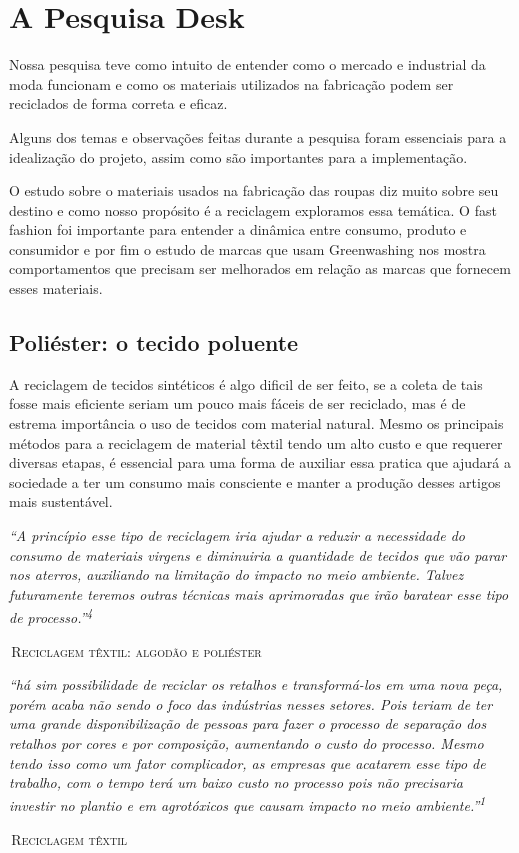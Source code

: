 \documentclass[12pt, a4paper]{article}
\newcommand{\novaSecao}[1]{\clearpage\vspace*{2.2cm}\section{#1}}
\newenvironment{citacaoBox}{%
  \par\vspace{6pt}%
  \def\FrameCommand{{\color{oliveSoft}\vrule width 2pt}\hspace{12pt}}%
  \MakeFramed{\advance\hsize-\width\FrameRestore}%
  \small\itshape\color{ink}%
}{%
  \par\endMakeFramed\vspace{6pt}%
}
\newcommand{\citacaoDestaque}[2]{%
  \begin{citacaoBox}#1\par\vspace{4pt}%
    {\normalfont\footnotesize\color{slate}\hfill\textsc{\textemdash{}\,#2}}%
  \end{citacaoBox}%
}
\newif\ifmostrarcorrecoes
\newcommand{\correcao}[1]{%
  \ifmostrarcorrecoes
    \par\vspace{6pt}\noindent
    \setlength{\fboxsep}{9pt}%
    \fcolorbox{corCorrecao}{corCorrecaoBg}{%
      \begin{minipage}{\dimexpr\linewidth-2\fboxsep-2\fboxrule\relax}
        {\sffamily\bfseries\footnotesize\color{corCorrecao}\textsf{CORREÇÃO \textemdash{} PROFA. SAMARA}}\par\vspace{3pt}
        {\normalfont\small\color{corCorrecao} #1}
      \end{minipage}}%
    \par\vspace{6pt}
  \fi
}
\begin{document}
\novaSecao{A Pesquisa Desk}

Nossa pesquisa teve como intuito de entender como o mercado e industrial da moda funcionam e como os materiais utilizados na fabricação podem ser reciclados de forma correta e eficaz.

Alguns dos temas e observações feitas durante a pesquisa foram essenciais para a idealização do projeto, assim como são importantes para a implementação.

O estudo sobre o materiais usados na fabricação das roupas diz muito sobre seu destino e como nosso propósito é a reciclagem exploramos essa temática. O fast fashion foi importante para entender a dinâmica entre consumo, produto e consumidor e por fim o estudo de marcas que usam Greenwashing nos mostra comportamentos que precisam ser melhorados em relação as marcas que fornecem esses materiais.

\correcao{Falta informar o escopo temporal da pesquisa: até quando (e a partir de quando) foram feitas as buscas no Google. Indicar o período de coleta dos dados/artigos consultados.}

\subsection{Poliéster: o tecido poluente}
A reciclagem de tecidos sintéticos é algo dificil de ser feito, se a coleta de tais fosse mais eficiente seriam um pouco mais fáceis de ser reciclado, mas é de estrema importância o uso de tecidos com material natural. Mesmo os principais métodos para a reciclagem de material têxtil tendo um alto custo e que requerer diversas etapas, é essencial para uma forma de auxiliar essa pratica que ajudará a sociedade a ter um consumo mais consciente e manter a produção desses artigos mais sustentável.

\citacaoDestaque{``A princípio esse tipo de reciclagem iria ajudar a reduzir a necessidade do consumo de materiais virgens e diminuiria a quantidade de tecidos que vão parar nos aterros, auxiliando na limitação do impacto no meio ambiente. Talvez futuramente teremos outras técnicas mais aprimoradas que irão baratear esse tipo de processo.''\textsuperscript{4}}{Reciclagem têxtil: algodão e poliéster}

\citacaoDestaque{``há sim possibilidade de reciclar os retalhos e transformá-los em uma nova peça, porém acaba não sendo o foco das indústrias nesses setores. Pois teriam de ter uma grande disponibilização de pessoas para fazer o processo de separação dos retalhos por cores e por composição, aumentando o custo do processo. Mesmo tendo isso como um fator complicador, as empresas que acatarem esse tipo de trabalho, com o tempo terá um baixo custo no processo pois não precisaria investir no plantio e em agrotóxicos que causam impacto no meio ambiente.''\textsuperscript{1}}{Reciclagem têxtil}
\end{document}
